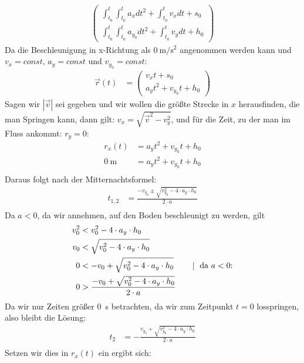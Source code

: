 \documentclass[sectionformat = aufgabe]{gadsescript}
\begin{document}
\begin{enumerate}[label=\alph*)]
\begin{align*}
\begin{pmatrix}
					\int_{t_0}^{t} \int_{t_0}^{t} a_x dt^2 + \int_{t_0}^{t} v_x dt + s_0\\
					\int_{t_0}^{t} \int_{t_0}^{t} a_{y_0} dt^2 + \int_{t_0}^{t} v_y dt + h_0
				\end{pmatrix}
		\end{align*}
		Da die Beschleunigung in x-Richtung als $\qty{0}{\metre\per\square\second}$ angenommen werden kann und $v_x = const $, $ a_y = const $ und $ v_{y_0} = const$:
		\begin{align*}
			\vec r(t)&= \begin{pmatrix}
					v_xt + s_0\\
					a_yt^2 + v_{y_0}t + h_0
				\end{pmatrix}
		\end{align*}
		Sagen wir $ | \vec v | $ sei gegeben und wir wollen die größte Strecke in $ x $ herausfinden, die man Springen kann, dann gilt: $ v_x = \sqrt{ \vec v^2 - v_y^2 } $, und für die Zeit, zu der man im Fluss ankommt: $ r_y = 0 $:
		\begin{align*}
			r_x(t) &= a_yt^2 + v_{y_0}t + h_0\\
			\qty{0}{\metre} &= a_y t^2 + v_{y_0}t + h_0\\
		\end{align*}
		Daraus folgt nach der Mitternachtsformel:
		\begin{align*}
			t_{1,2} &= \frac{-v_{y_0} \pm \sqrt{v_{y_0}^2 - 4\cdot a_y\cdot h_0}}{2\cdot a}\\
		\end{align*}
		Da $ a < 0 $, da wir annehmen, auf den Boden beschleunigt zu werden, gilt
		\begin{align*}
			v_0^2 &< v_0^2 - 4 \cdot a_y \cdot h_0\\
			v_0 &< \sqrt{v_0^2 - 4 \cdot a_y \cdot h_0}\\
			0 &< - v_0 + \sqrt{ v_0^2 - 4 \cdot a_y \cdot h_0} \qquad \mid \text{ da $ a < 0 $:}\\
			0 &> \frac{ - v_0 + \sqrt{ v_0^2 - 4 \cdot a_y \cdot h_0}}{2\cdot a}\\
		\end{align*}
		Da wir nur Zeiten größer \qty{0}{\second} betrachten, da wir zum Zeitpunkt $ t = 0 $ losspringen, also bleibt die Lösung:
		\begin{align*}
			t_{2} &= - \frac{v_{y_0} + \sqrt{v_{y_0}^2 - 4\cdot a_y\cdot h_0}}{2\cdot a}\\
		\end{align*}
		Setzen wir dies in $ r_x(t) $ ein ergibt sich:
		\begin{align*}

\end{align*}
\end{enumerate}
\end{document}
